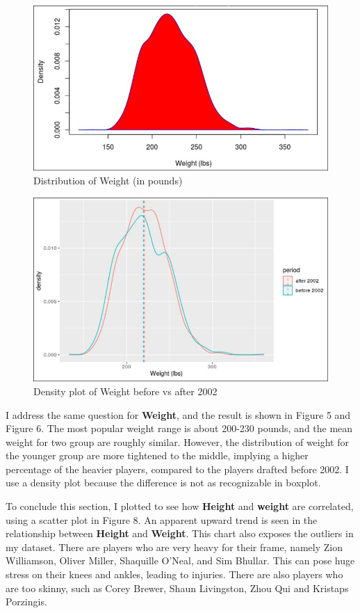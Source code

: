 \documentclass[a4paper,12pt,twoside]{article}
\numberwithin{equation}{section}
\begin{document}
\begin{figure}[h]
\caption{Distribution of Weight (in pounds)}
\includegraphics[scale=0.3]{dsow.jpg}
\centering
\end{figure}

\begin{figure}[h]
\caption{Density plot of Weight before vs after 2002}
\includegraphics[scale=0.32]{webf02.jpg}
\centering
\end{figure}
I address the same question for \textbf{Weight}, and the result is shown in Figure 5 and Figure 6. The most popular weight range is about 200-230 pounds, and the mean weight for two group are roughly similar. However, the distribution of weight for the younger group are more tightened to the middle, implying a higher percentage of the heavier players, compared to the players drafted before 2002. I use a density plot because the difference is not as recognizable in boxplot.


To conclude this section, I plotted to see how \textbf{Height} and \textbf{weight} are correlated, using a scatter plot in Figure 8. An apparent upward trend is seen in the relationship between \textbf{Height} and \textbf{Weight}. This chart also exposes the outliers in my dataset. There are players who are very heavy for their frame, namely Zion Williamson, Oliver Miller, Shaquille O'Neal, and Sim Bhullar. This can pose huge stress on their knees and ankles, leading to injuries. There are also players who are too skinny, such as Corey Brewer, Shaun Livingston, Zhou Qui and Kristaps Porzingis.
\end{document}
